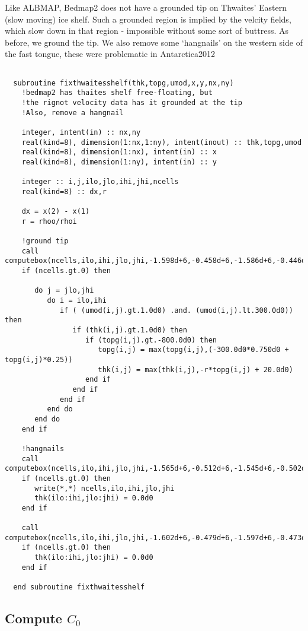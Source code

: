 \documentclass{article}
\begin{document}
Like ALBMAP, Bedmap2 does not have a grounded tip on Thwaites' Eastern (slow moving) ice shelf.
Such a grounded region is implied by the velcity fields, which slow down in that region - impossible
without some sort of buttress. As before, we ground the tip. We also remove some `hangnails' on the
western side of the fast tongue, these were problematic in Antarctica2012
\begin{lstlisting}

  subroutine fixthwaitesshelf(thk,topg,umod,x,y,nx,ny)
    !bedmap2 has thaites shelf free-floating, but
    !the rignot velocity data has it grounded at the tip
    !Also, remove a hangnail

    integer, intent(in) :: nx,ny
    real(kind=8), dimension(1:nx,1:ny), intent(inout) :: thk,topg,umod
    real(kind=8), dimension(1:nx), intent(in) :: x
    real(kind=8), dimension(1:ny), intent(in) :: y

    integer :: i,j,ilo,jlo,ihi,jhi,ncells
    real(kind=8) :: dx,r

    dx = x(2) - x(1)
    r = rhoo/rhoi

    !ground tip   
    call computebox(ncells,ilo,ihi,jlo,jhi,-1.598d+6,-0.458d+6,-1.586d+6,-0.446d+6,x,y,nx,ny)
    if (ncells.gt.0) then

       do j = jlo,jhi
          do i = ilo,ihi
             if ( (umod(i,j).gt.1.0d0) .and. (umod(i,j).lt.300.0d0)) then
                if (thk(i,j).gt.1.0d0) then
                   if (topg(i,j).gt.-800.0d0) then
                      topg(i,j) = max(topg(i,j),(-300.0d0*0.750d0 + topg(i,j)*0.25))
                      thk(i,j) = max(thk(i,j),-r*topg(i,j) + 20.0d0)
                   end if
                end if
             end if
          end do
       end do
    end if

    !hangnails
    call computebox(ncells,ilo,ihi,jlo,jhi,-1.565d+6,-0.512d+6,-1.545d+6,-0.502d+6,x,y,nx,ny)
    if (ncells.gt.0) then
       write(*,*) ncells,ilo,ihi,jlo,jhi
       thk(ilo:ihi,jlo:jhi) = 0.0d0
    end if

    call computebox(ncells,ilo,ihi,jlo,jhi,-1.602d+6,-0.479d+6,-1.597d+6,-0.473d+6,x,y,nx,ny)
    if (ncells.gt.0) then
       thk(ilo:ihi,jlo:jhi) = 0.0d0
    end if

  end subroutine fixthwaitesshelf
\end{lstlisting}

\subsection{\label{sec::cco} Compute $C_0$}
\end{document}
